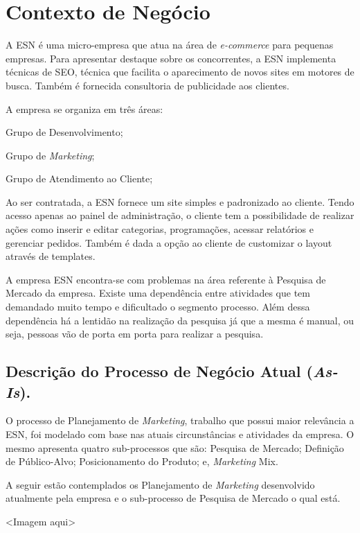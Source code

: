 \section{Contexto de Negócio}
	A ESN é uma micro-empresa que atua na área de \textit{e-commerce} para pequenas empresas. Para apresentar destaque sobre os concorrentes, a ESN implementa técnicas de SEO, técnica que facilita o aparecimento de novos sites em motores de busca. Também é fornecida consultoria de publicidade aos clientes.

	A empresa se organiza em três áreas:
	\begin{itemize}
	{
		\item Grupo de Desenvolvimento;
		\item Grupo de \textit{Marketing};
		\item Grupo de Atendimento ao Cliente;
	}
	\end{itemize}

	Ao ser contratada, a ESN fornece um site simples e padronizado ao cliente. Tendo acesso apenas ao painel de administração, o cliente tem a possibilidade de realizar ações como inserir e editar categorias, programações, acessar relatórios e gerenciar pedidos. Também é dada a opção ao cliente de customizar o layout através de templates.

	A empresa ESN encontra-se com problemas na área referente à Pesquisa de Mercado da empresa. Existe uma dependência entre atividades que tem demandado muito tempo e dificultado o segmento processo. Além dessa dependência há a lentidão na realização da pesquisa já que a mesma é manual, ou seja, pessoas vão de porta em porta para realizar a pesquisa.

	\subsection{Descrição do Processo de Negócio Atual (\textit{As-Is}).}

		O processo de Planejamento de \textit{Marketing}, trabalho que possui maior relevância a ESN, foi modelado com base nas atuais circunstâncias e atividades da empresa. O mesmo apresenta quatro sub-processos que são: Pesquisa de Mercado; Definição de Público-Alvo; Posicionamento do Produto; e, \textit{Marketing} Mix.

		A seguir estão contemplados os Planejamento de \textit{Marketing} desenvolvido atualmente pela empresa e o sub-processo de Pesquisa de Mercado o qual está.

		<Imagem aqui>


